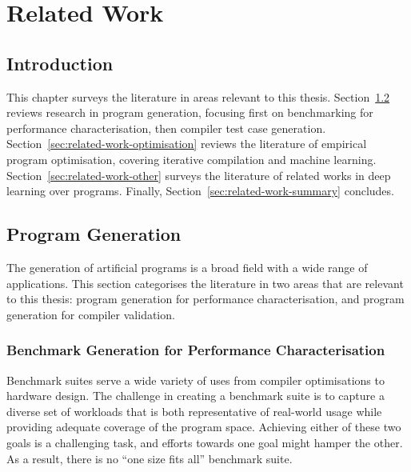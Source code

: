 \chapter{Related Work}
\label{chap:related-work}

\section{Introduction}

This chapter surveys the literature in areas relevant to this thesis. Section~\ref{sec:related-work-generation} reviews research in program generation, focusing first on benchmarking for performance characterisation, then compiler test case generation. Section~\ref{sec:related-work-optimisation} reviews the literature of empirical program optimisation, covering iterative compilation and machine learning. Section~\ref{sec:related-work-other} surveys the literature of related works in deep learning over programs. Finally, Section~\ref{sec:related-work-summary} concludes.


\section{Program Generation}
\label{sec:related-work-generation}

The generation of artificial programs is a broad field with a wide range of applications. This section categorises the literature in two areas that are relevant to this thesis: program generation for performance characterisation, and program generation for compiler validation.

\subsection{Benchmark Generation for Performance Characterisation}

Benchmark suites serve a wide variety of uses from compiler optimisations to hardware design. The challenge in creating a benchmark suite is to capture a diverse set of workloads that is both representative of real-world usage while providing adequate coverage of the program space. Achieving either of these two goals is a challenging task, and efforts towards one goal might hamper the other. As a result, there is no ``one size fits all'' benchmark suite.

